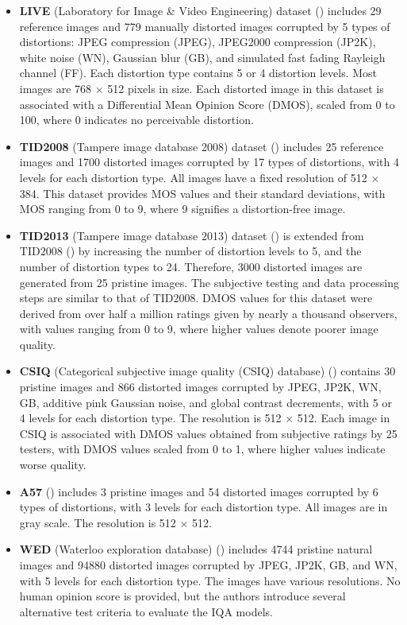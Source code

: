 \vspace{\baselineskip}
\begin{itemize}
    \item \textbf{LIVE} (Laboratory for Image \& Video Engineering) dataset (\cite{LIVE}) includes 29 reference images and 779 manually distorted images corrupted by 5 types of distortions: JPEG compression (JPEG), JPEG2000 compression (JP2K), white noise (WN), Gaussian blur (GB), and simulated fast fading Rayleigh channel (FF). Each distortion type contains 5 or 4 distortion levels. Most images are 768 $\times$ 512 pixels in size. Each distorted image in this dataset is associated with a Differential Mean Opinion Score (DMOS), scaled from 0 to 100, where 0 indicates no perceivable distortion. 
    \item \textbf{TID2008} (Tampere image database 2008) dataset (\cite{TID2008}) includes 25 reference images and 1700 distorted images corrupted by 17 types of distortions, with 4 levels for each distortion type. All images have a fixed resolution of 512 $\times$ 384. This dataset provides MOS values and their standard deviations, with MOS ranging from 0 to 9, where 9 signifies a distortion-free image.
    \item \textbf{TID2013} (Tampere image database 2013) dataset (\cite{TID2013}) is extended from TID2008 (\cite{TID2008}) by increasing the number of distortion levels to 5, and the number of distortion types to 24. Therefore, 3000 distorted images are generated from 25 pristine images. The subjective testing and data processing steps are similar to that of TID2008. DMOS values for this dataset were derived from over half a million ratings given by nearly a thousand observers, with values ranging from 0 to 9, where higher values denote poorer image quality.
    \item \textbf{CSIQ} (Categorical subjective image quality (CSIQ) database) (\cite{CSIQ}) contains 30 pristine images and 866 distorted images corrupted by JPEG, JP2K, WN, GB, additive pink Gaussian noise, and global contrast decrements, with 5 or 4 levels for each distortion type. The resolution is 512 $\times$ 512. Each image in CSIQ is associated with DMOS values obtained from subjective ratings by 25 testers, with DMOS values scaled from 0 to 1, where higher values indicate worse quality.
    \item \textbf{A57} (\cite{A57}) includes 3 pristine images and 54 distorted images corrupted by 6 types of distortions, with 3 levels for each distortion type. All images are in gray scale. The resolution is 512 $\times$ 512. 
    \item \textbf{WED} (Waterloo exploration database) (\cite{WED}) includes 4744 pristine natural images and 94880 distorted images corrupted by JPEG, JP2K, GB, and WN, with 5 levels for each distortion type. The images have various resolutions. No human opinion score is provided, but the authors introduce several alternative test criteria to evaluate the IQA models.
\end{itemize}

